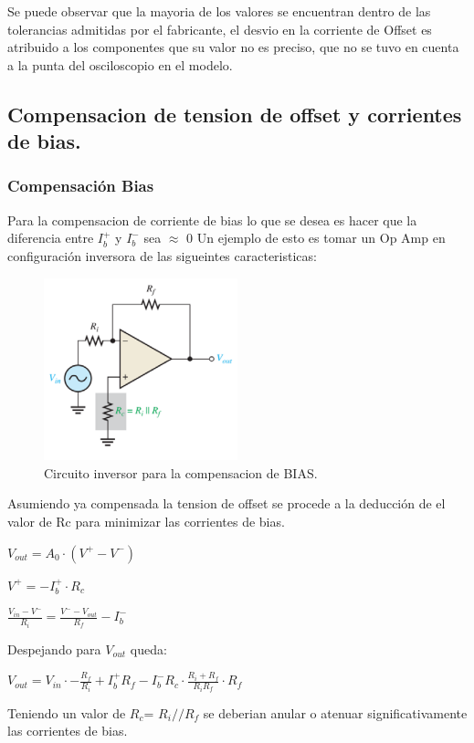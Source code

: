 \documentclass[a4paper]{article}
\begin{document}
Se puede observar que la mayoria de los valores se encuentran dentro de las tolerancias admitidas por el fabricante, el desvio en la corriente de Offset es atribuido a los componentes que su valor no es preciso, que no se tuvo en cuenta a la punta del osciloscopio en el modelo.
\subsection{Compensacion de tension de offset y corrientes de bias.}
\subsubsection{Compensación Bias}
Para la compensacion de corriente de bias lo que se desea es hacer que la diferencia entre $I_b^+$ y $I_b^-$ sea $\approx$ 0
Un ejemplo de esto es tomar un Op Amp en configuración inversora  de las sigueintes caracteristicas:
\begin{figure}[H]	
	\centering
	\includegraphics[width=0.5\textwidth]{imagenes/CompensacionBias.PNG}
	\caption{Circuito inversor para la compensacion de BIAS.}
	\label{fig:CompensacionBias}
\end{figure}
Asumiendo ya compensada la tension de offset se procede a la deducción de el valor de Rc para minimizar las corrientes de bias.
\begin{center}$V_{out}=A_0 \cdot (V^+ - V^-)$\\\end{center}
\begin{center}$V^+=-I_b^+ \cdot R_c$\\\end{center}
\begin{center}$\frac{V_{in}-V^-}{R_i}=\frac{V^- - V_{out}}{R_f} -I_b^-$\\\end{center}
Despejando para $V_{out}$ queda:
\begin{center}$V_{out}=V_{in}\cdot -\frac{R_f}{R_i}+I_b^+ R_f-I_b^- R_c \cdot \frac{R_i+R_f}{R_i R_f}\cdot R_f $\\\end{center}
Teniendo un valor de $R_c$= $R_i//R_f$ se deberian anular o atenuar significativamente las corrientes de bias.
\end{document}
